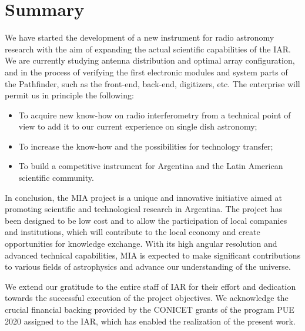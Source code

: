 \documentclass[baaa]{baaa}
\begin{document}
\section{Summary}
\label{sec:Summary}
We have started the development of a new instrument for radio astronomy research with the aim of expanding the actual scientific capabilities of the IAR.
We are currently studying antenna distribution and optimal array configuration, and in the process of verifying the first electronic modules and system parts of the Pathfinder, such as the front-end, back-end, digitizers, etc. The enterprise will permit us in principle the following:
\begin{itemize}
\item To acquire new know-how on radio interferometry from a technical point of view to add it to our current experience on single dish astronomy; 
\item To increase the know-how and the possibilities for technology transfer;
\item To build a competitive instrument for Argentina and the Latin American scientific community.
\end{itemize}			
In conclusion, the MIA project is a unique and innovative initiative aimed at promoting scientific and technological research in Argentina. The project has been designed to be low cost and to allow the participation of local companies and institutions, which will contribute to the local economy and create opportunities for knowledge exchange. With its high angular resolution and advanced technical capabilities, MIA is expected to make significant contributions to various fields of astrophysics and advance our understanding of the universe.

\begin{acknowledgement}
We extend our gratitude to the entire staff of IAR for their effort and dedication towards the successful execution of the project objectives. We acknowledge the crucial financial backing provided by the CONICET grants of the program PUE 2020 assigned to the IAR, which has enabled the realization of the present work.
\end{acknowledgement}


\end{document}
